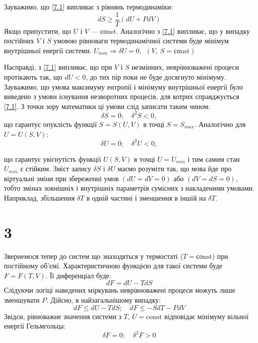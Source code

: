 Зауважимо, що \eqref{7.1} випливає з рівнянь термодинаміки:
\begin{equation}\label{7.2}
	dS \geq \dfrac{1}{T}(dU + PdV)
\end{equation}
Якщо припустити, що $U$ і $V$ --- соnst. Аналогічно з \eqref{7.1} випливає, що у випадку постійних $V$ і $S$ умовою рівноваги термодинамічної системи буде мінімум внутрішньої енергії системи. $U_{min} \Rightarrow \delta U = 0,~~ (V,~S = \text{соnst})$

Насправді, з \eqref{7.1} випливає, що при $V$ і $S$ незмінних, неврівноважені процеси протікають так, що $dU<0$, до тих пір поки не буде досягнуто мінімуму. Зауважимо, що умова максимуму ентропії і мінімуму внутрішньої енергії було виведено з умови існування незворотних процесів, для котрих справджується \eqref{7.1}. З точки зору математики ці умови слід записати таким чином:
\begin{equation}\label{7.3}
	\delta S = 0; \quad \delta^2 S < 0,
\end{equation}
що гарантує опуклість функції $S=S(U,V)$ в точці $S=S_{max}$. Аналогічно для $U=U(S,V)$:
\begin{equation}\label{7.4}
	\delta U =0; \quad \delta^2 U < 0,
\end{equation}

що гарантує увігнутість функції $U(S,V)$ в точці $U=U_{min}$ і тим самим стан $U_{min}$ є стійким. Зміст запису $\delta S$ і $\delta U$ маємо розуміти так, що мова йде про віртуальні зміни при збереженні умов $(dU=dV=0)$ або $(dV=dS=0)$, тобто змінах зовнішніх і внутрішніх параметрів сумісних з накладеними умовами. Наприклад, збільшення $\delta T$ в одній частині і зменшення в іншій на $\delta T$.

\section{3}

Звернемося тепер до систем що знаходяться у термостаті ($T=\text{соnst}$) при постійному об'ємі. Характеристичною функцією для такої системи буде $F=F(T,V)$. Її диференціал буде:
\begin{equation}\label{7.5}
	dF = dU -TdS
\end{equation}
Слідуючи логіці наведених міркувань неврівноважені процеси можуть лише зменшувати $P$. Дійсно, в найзагальнішому випадку:
\begin{equation}\label{7.6}
	dF\leq dU-TdS; \quad dF\leq -SdT-PdV
\end{equation}
Звідси, рівноважне значення системи з $T$, $U=\text{const}$ відповідає мінімуму вільної енергії Гельмгольца:
\begin{equation}\label{7.7}
	\delta F = 0; \quad \delta^2 F >0
\end{equation}


